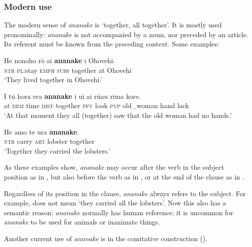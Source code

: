 \subsubsection[Modern use]{Modern use}\label{sec:4.4.4.1}

The modern sense of \textit{ananake} is ‘together, all together’. It is mostly used pronominally: \textit{ananake} is not accompanied by a noun, nor preceded by an article. Its referent must be known from the preceding context. Some examples:

\ea\label{ex:4.63}
\gll He nonoho rō {\ꞌ}ai \textbf{ananake} {\ꞌ}i {\ꞌ}Ohovehi. \\
\textsc{ntr} \textsc{pl}:stay \textsc{emph} \textsc{subs} together at Ohovehi \\

\glt 
‘They lived together in Ohovehi.’ \textstyleExampleref{[R310.481]} 
\z

\ea\label{ex:4.64}
\gll {\ꞌ}I tū hora era \textbf{ananake} i u{\ꞌ}i ai rū{\ꞌ}au rima kore. \\
at \textsc{dem} time \textsc{dist} together \textsc{pfv} look \textsc{pvp} old\_woman hand lack \\

\glt 
‘At that moment they all (together) saw that the old woman had no hands.’ \textstyleExampleref{[R437.085]} 
\z

\ea\label{ex:4.65}
\gll He {\ꞌ}amo te {\ꞌ}ura \textbf{ananake}. \\
\textsc{ntr} carry \textsc{art} lobster together \\

\glt
‘Together they carried the lobsters.’ \textstyleExampleref{[R410.045]} 
\z

As these examples show, \textit{ananake} may occur after the verb in the subject position as in , but also before the verb as in , or at the end of the clause as in .

Regardless of its position in the clause, \textit{ananake} always refers to the subject. For example,  does not mean ‘they carried all the lobsters’. Now this also has a semantic reason: \textit{ananake} normally has human reference; it is uncommon for \textit{ananake} to be used for animals or inanimate things. 

Another current use of \textit{ananake} is in the comitative construction ().

